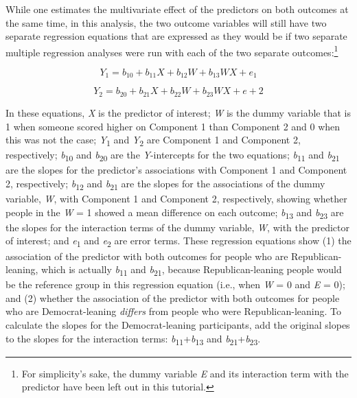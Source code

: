 \documentclass[authordate, meta, issue]{jote-new-article}
\begin{document}
	While one estimates the multivariate effect of the predictors on both outcomes at the same time, in this analysis, the two outcome variables will still have two separate regression equations that are expressed as they would be if two separate multiple regression analyses were run with each of the two separate outcomes:\footnote{ For simplicity's sake, the dummy variable \emph{E} and its interaction term with the predictor have been left out in this tutorial.}



	\begin{equation}
		Y_1= b_{10}+b_{11}X+b_{12}W+b_{13}WX+e_1
	\end{equation}



	\begin{equation}
		Y_2= b_{20}+b_{21}X+b_{22}W+b_{23}WX+e+2
	\end{equation}



	In these equations, \emph{X }is the predictor of interest; \emph{W} is the dummy variable that is 1 when someone scored higher on Component 1 than Component 2 and 0 when this was not the case; \emph{Y}\textsubscript{1} and \emph{Y}\textsubscript{2} are Component 1 and Component 2, respectively; \emph{b}\textsubscript{10}\textsubscript{ }and \emph{b}\textsubscript{20} are the \emph{Y}-intercepts for the two equations; \emph{b}\textsubscript{11} and \emph{b}\textsubscript{21} are the slopes for the predictor's associations with Component 1 and Component 2, respectively; \emph{b}\textsubscript{12} and \emph{b}\textsubscript{21} are the slopes for the associations of the dummy variable, \emph{W}, with Component 1 and Component 2, respectively, showing whether people in the \emph{W} = 1 showed a mean difference on each outcome; \emph{b}\textsubscript{13} and \emph{b}\textsubscript{23} are the slopes for the interaction terms of the dummy variable, \emph{W}, with the predictor of interest; and \emph{e}\textsubscript{1} and \emph{e}\textsubscript{2} are error terms. These regression equations show (1) the association of the predictor with both outcomes for people who are Republican-leaning, which is actually \emph{b}\textsubscript{11} and \emph{b}\textsubscript{21}, because Republican-leaning people would be the reference group in this regression equation (i.e., when \emph{W} = 0 and \emph{E} = 0); and (2) whether the association of the predictor with both outcomes for people who are Democrat-leaning \emph{differs} from people who were Republican-leaning. To calculate the slopes for the Democrat-leaning participants, add the original slopes to the slopes for the interaction terms: \emph{b}\textsubscript{11}+\emph{b}\textsubscript{13} and \emph{b}\textsubscript{21}+\emph{b}\textsubscript{23}.
\end{document}
